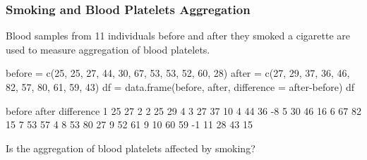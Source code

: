\documentclass[a4paper]{article}
\begin{document}
\subsubsection{Smoking and Blood Platelets Aggregation}
	Blood samples from 11 individuals before and after they smoked a cigarette are used to measure aggregation of blood platelets.
\begin{Schunk}
\begin{Sinput}
before = c(25, 25, 27, 44, 30, 67, 53, 53, 52, 60, 28)
after =  c(27, 29, 37, 36, 46, 82, 57, 80, 61, 59, 43)
df = data.frame(before, after,
                difference = after-before)
df
\end{Sinput}
\begin{Soutput}
   before after difference
1      25    27          2
2      25    29          4
3      27    37         10
4      44    36         -8
5      30    46         16
6      67    82         15
7      53    57          4
8      53    80         27
9      52    61          9
10     60    59         -1
11     28    43         15
\end{Soutput}
\end{Schunk}
\begin{goldbox}
	Is the aggregation of blood platelets affected by smoking?
\end{goldbox}
\end{document}
